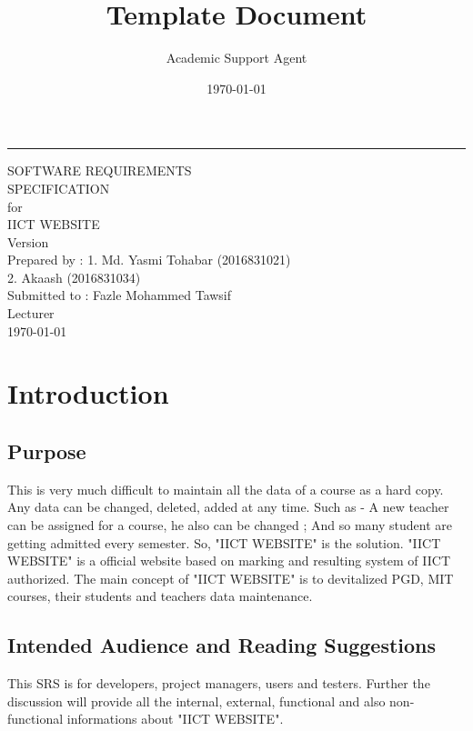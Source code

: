 \documentclass{article}
\title{Template Document}
\author{Academic Support Agent}
\date{\today}
\begin{document}
\maketitle

\begin{flushright}
    \rule{16cm}{5pt}\vskip1cm
    \begin{bfseries}
        \Huge{SOFTWARE REQUIREMENTS\\ SPECIFICATION}\\
        \vspace{1.5cm}
        for\\
        \vspace{1.5cm}
        IICT WEBSITE\\
        \vspace{1.5cm}
        \LARGE{Version \myversion}\\
        \vspace{1.5cm}
        Prepared by : 1. Md. Yasmi Tohabar (2016831021)\\
        2. Akaash (2016831034)\\
        \vspace{1.5cm}
        Submitted to : Fazle Mohammed Tawsif \\Lecturer\\
        \vspace{1.5cm}
        \today\\
    \end{bfseries}
\end{flushright}



\chapter{Introduction}

\section{Purpose}
This is very much difficult to maintain all the data of a course as a hard copy. Any data can be changed, deleted, added at any time. Such as - A new teacher can be assigned for a course, he also can be changed ; And so many student are getting admitted every semester. So, "IICT WEBSITE" is the solution. "IICT WEBSITE" is a official website based on marking and resulting system of IICT authorized. The main concept of "IICT WEBSITE" is to devitalized PGD, MIT courses, their students and teachers data maintenance. 

\section{Intended Audience and Reading Suggestions}
This SRS is for developers, project managers, users and testers. Further the discussion will provide all the internal, external, functional and also non-functional informations about "IICT WEBSITE".
\end{document}
